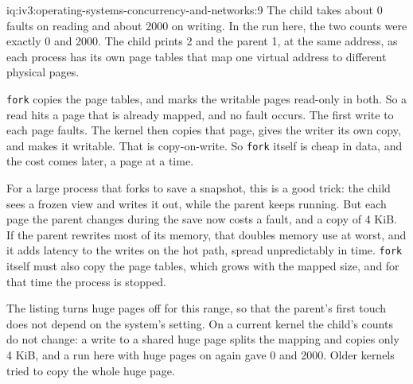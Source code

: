 \begin{solution}{iq:iv3:operating-systems-concurrency-and-networks:9}
The child takes about 0 faults on reading and about 2000 on writing. In the run here, the two counts were exactly 0 and 2000. The child prints 2 and the parent 1, at the same address, as each process has its own page tables that map one virtual address to different physical pages.

\texttt{fork} copies the page tables, and marks the writable pages read-only in both. So a read hits a page that is already mapped, and no fault occurs. The first write to each page faults. The kernel then copies that page, gives the writer its own copy, and makes it writable. That is copy-on-write. So \texttt{fork} itself is cheap in data, and the cost comes later, a page at a time.

For a large process that forks to save a snapshot, this is a good trick: the child sees a frozen view and writes it out, while the parent keeps running. But each page the parent changes during the save now costs a fault, and a copy of 4 KiB. If the parent rewrites most of its memory, that doubles memory use at worst, and it adds latency to the writes on the hot path, spread unpredictably in time. \texttt{fork} itself must also copy the page tables, which grows with the mapped size, and for that time the process is stopped.

The listing turns huge pages off for this range, so that the parent's first touch does not depend on the system's setting. On a current kernel the child's counts do not change: a write to a shared huge page splits the mapping and copies only 4 KiB, and a run here with huge pages on again gave 0 and 2000. Older kernels tried to copy the whole huge page.

\end{solution}

